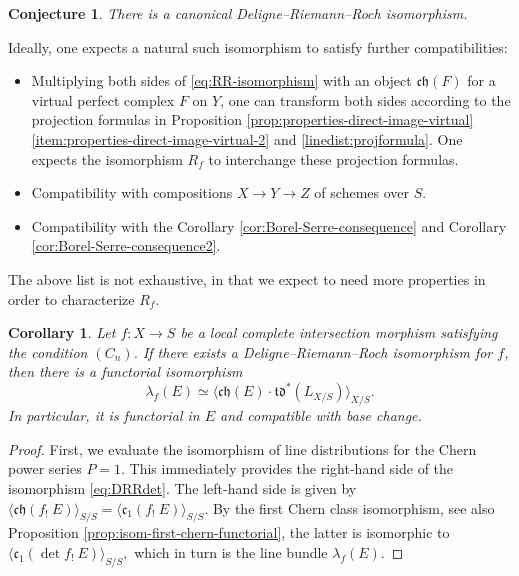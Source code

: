 \documentclass[11pt]{article}
\theoremstyle{plain}
\newtheorem{corollary}[theorem]{Corollary}
\newtheorem*{conjecture}{Conjecture}
\theoremstyle{definition}
\newcommand{\cfrak}{\mathfrak c}
\newcommand{\chfrak}{\mathfrak {ch}}
\newcommand{\tdfrak}{\mathfrak {td}}
\begin{document}
\begin{conjecture}
There is a canonical Deligne--Riemann--Roch isomorphism.

\end{conjecture}
Ideally, one expects a natural such isomorphism to satisfy further compatibilities:

\begin{itemize}
\item Multiplying both sides of \eqref{eq:RR-isomorphism} with an object $\chfrak(F)$ for a virtual perfect complex $F$ on $Y$, one can transform both sides according to the projection formulas in Proposition \ref{prop:properties-direct-image-virtual}\eqref{item:properties-direct-image-virtual-2} and \eqref{linedist:projformula}. One expects the isomorphism $R_{f}$ to interchange these projection formulas.
\item Compatibility with compositions $X \to Y \to Z$ of schemes over $S$.
\item Compatibility with the Corollary \ref{cor:Borel-Serre-consequence} and Corollary \ref{cor:Borel-Serre-consequence2}.
\end{itemize}
The above list is not exhaustive, in that we expect to need more properties in order to characterize $R_{f}$.

\begin{corollary}
Let $f: X \to S$ be a local complete intersection morphism satisfying the condition $(C_n)$. If there exists a Deligne--Riemann--Roch isomorphism for $f$, then there is a functorial isomorphism
\begin{equation}\label{eq:DRRdet}
\lambda_{f}(E) \simeq \langle \chfrak(E) \cdot \tdfrak^{\ast}(L_{X/S}) \rangle_{X/S}.
\end{equation}
In particular, it is functorial in $E$ and compatible with base change.
\end{corollary}

\begin{proof}
First, we evaluate the isomorphism of line distributions for the Chern power series $P = 1$. This immediately provides the right-hand side of the isomorphism \eqref{eq:DRRdet}. The left-hand side is given by $\langle \chfrak(f_!\ E) \rangle_{S/S} = \langle \cfrak_1(f_!\ E) \rangle_{S/S} $. By the first Chern class isomorphism, see also Proposition \ref{prop:isom-first-chern-functorial}, the latter is isomorphic to $ \langle \cfrak_1(\det f_!\ E) \rangle_{S/S}, $ which in turn is the line bundle $\lambda_{f}(E)$.
\end{proof}
\end{document}
